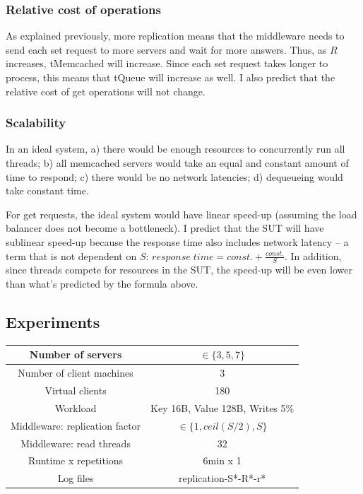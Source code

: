 \documentclass[11pt]{article}
\begin{document}
\subsubsection{Relative cost of operations}
As explained previously, more replication means that the middleware needs to send each set request to more servers and wait for more answers. Thus, as $R$ increases, tMemcached will increase. Since each set request takes longer to process, this means that tQueue will increase as well. I also predict that the relative cost of get operations will not change.


\subsubsection{Scalability}

In an ideal system, a) there would be enough resources to concurrently run all threads; b) all memcached servers would take an equal and constant amount of time to respond; c) there would be no network latencies; d) dequeueing would take constant time.

For get requests, the ideal system would have linear speed-up (assuming the load balancer does not become a bottleneck). I predict that the SUT will have sublinear speed-up because the response time also includes network latency -- a term that is not dependent on $S$: $response \; time = const. + \frac{const.}{S}$. In addition, since threads compete for resources in the SUT, the speed-up will be even lower than what's predicted by the formula above.

\subsection{Experiments}
\begin{center}
\small{
\smallskip
\begin{tabular}{|c|c|}
\hline Number of servers & $\in \{3, 5, 7\}$ \\ 
\hline Number of client machines & 3 \\ 
\hline Virtual clients & 180 \\ 
\hline Workload & Key 16B, Value 128B, Writes 5\% \\
\hline Middleware: replication factor & $\in \{1, ceil(S/2), S\}$ \\ 
\hline Middleware: read threads & 32 \\ 
\hline Runtime x repetitions & 6min x 1 \\ 
\hline Log files & replication-S*-R*-r* \\
\hline 
\end{tabular} }
\end{center}
\end{document}
